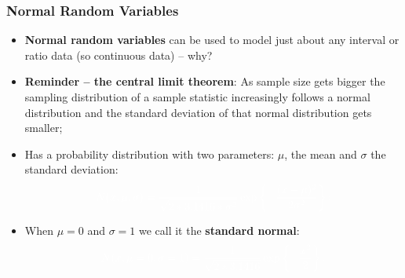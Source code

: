 \documentclass[aspectratio=169]{beamer}
\theoremstyle{principle}
\begin{document}
\begin{frame}
\frametitle{Normal Random Variables}

\begin{itemize}
\item \textbf{Normal random variables} can be used to model just about any interval or ratio data (so continuous data) -- why?
\bigskip

\item[]\color{white} \textbf{Reminder -- the central limit theorem}: As sample size gets bigger the sampling distribution of a sample statistic increasingly follows a normal distribution and the standard deviation of that normal distribution gets smaller;
\bigskip

\item[]\color{white} Has a probability distribution with two parameters: $\mu$, the mean and $\sigma$ the standard deviation:
\begin{align*}
\color{white}N(x,\mu,\sigma) = \frac{1}{\sqrt{2*3.1416*\sigma^2}}\exp\left\{-\frac{(x - \mu)^2}{2\sigma^2}\right\};
\end{align*}

\item[]\color{white} When $\mu = 0$ and $\sigma = 1$ we call it the \textbf{standard normal}:
\begin{align*}
\color{white}N(x,\mu=0,\sigma=1) = \frac{1}{\sqrt{2*3.1416}}\exp\left\{-\frac{x^2}{2}\right\}.
\end{align*}

\end{itemize}

\end{frame}
\end{document}
